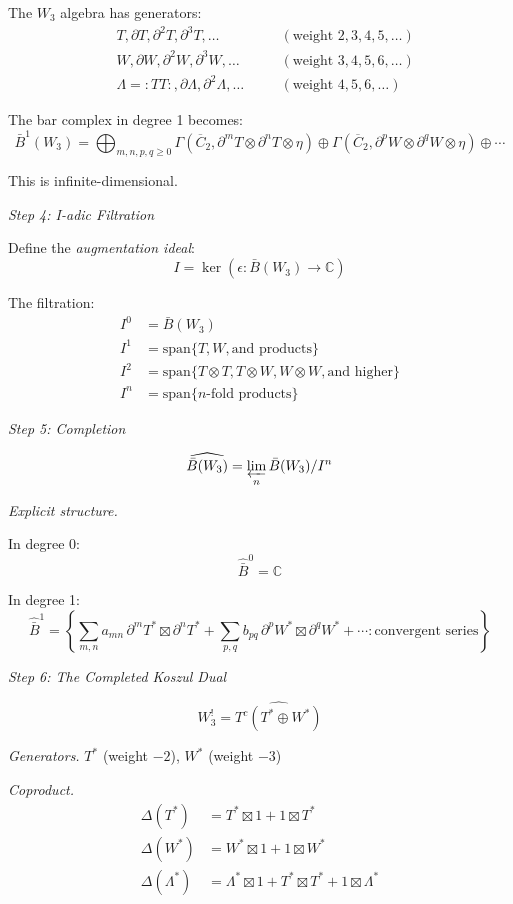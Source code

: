 \begin{example}
The $W_3$ algebra has generators:
\begin{align*}
&T, \partial T, \partial^2 T, \partial^3 T, \ldots \quad &&(\text{weight } 2, 3, 4, 5, \ldots) \\
&W, \partial W, \partial^2 W, \partial^3 W, \ldots \quad &&(\text{weight } 3, 4, 5, 6, \ldots) \\
&\Lambda = :TT:, \partial\Lambda, \partial^2\Lambda, \ldots \quad &&(\text{weight } 4, 5, 6, \ldots)
\end{align*}

The bar complex in degree 1 becomes:
\[\bar{B}^1(W_3) = \bigoplus_{m,n,p,q \geq 0} \Gamma(\overline{C}_2, \partial^m T \otimes \partial^n T \otimes \eta) \oplus \Gamma(\overline{C}_2, \partial^p W \otimes \partial^q W \otimes \eta) \oplus \cdots\]

This is infinite-dimensional.

\medskip
\noindent\emph{Step 4: I-adic Filtration}

Define the \emph{augmentation ideal}:
\[I = \ker(\epsilon: \bar{B}(W_3) \to \mathbb{C})\]

The filtration:
\begin{align*}
I^0 &= \bar{B}(W_3) \\
I^1 &= \text{span}\{T, W, \text{and products}\} \\
I^2 &= \text{span}\{T \otimes T, T \otimes W, W \otimes W, \text{and higher}\} \\
I^n &= \text{span}\{n\text{-fold products}\}
\end{align*}

\medskip
\noindent\emph{Step 5: Completion}

\[\widehat{\bar{B}(W_3)} = \varprojlim_n \bar{B}(W_3)/I^n\]

\emph{Explicit structure.}

In degree 0:
\[\widehat{\bar{B}}^0 = \mathbb{C}\]

In degree 1:
\[\widehat{\bar{B}}^1 = \left\{\sum_{m,n} a_{mn} \, \partial^m T^* \boxtimes \partial^n T^* + \sum_{p,q} b_{pq} \, \partial^p W^* \boxtimes \partial^q W^* + \cdots : \text{convergent series}\right\}\]

\medskip
\noindent\emph{Step 6: The Completed Koszul Dual}

\[W_3^! = \widehat{T^c(T^* \oplus W^*)}\]

\emph{Generators.} $T^*$ (weight $-2$), $W^*$ (weight $-3$)

\emph{Coproduct.}
\begin{align*}
\Delta(T^*) &= T^* \boxtimes 1 + 1 \boxtimes T^* \\
\Delta(W^*) &= W^* \boxtimes 1 + 1 \boxtimes W^* \\
\Delta(\Lambda^*) &= \Lambda^* \boxtimes 1 + T^* \boxtimes T^* + 1 \boxtimes \Lambda^*
\end{align*}


\end{example}
